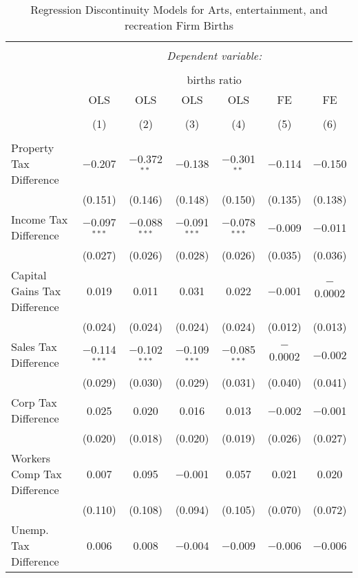 
\begin{table}[!htbp] \centering 
  \caption{Regression Discontinuity Models for  Arts, entertainment, and recreation Firm Births} 
  \label{71rd} 
\footnotesize 
\begin{tabular}{@{\extracolsep{5pt}}lcccccc} 
\\[-1.8ex]\hline 
\hline \\[-1.8ex] 
 & \multicolumn{6}{c}{\textit{Dependent variable:}} \\ 
\cline{2-7} 
\\[-1.8ex] & \multicolumn{6}{c}{births ratio} \\ 
 & OLS & OLS & OLS & OLS & FE & FE \\ 
\\[-1.8ex] & (1) & (2) & (3) & (4) & (5) & (6)\\ 
\hline \\[-1.8ex] 
 Property Tax Difference & $-$0.207 & $-$0.372$^{**}$ & $-$0.138 & $-$0.301$^{**}$ & $-$0.114 & $-$0.150 \\ 
  & (0.151) & (0.146) & (0.148) & (0.150) & (0.135) & (0.138) \\ 
  Income Tax Difference & $-$0.097$^{***}$ & $-$0.088$^{***}$ & $-$0.091$^{***}$ & $-$0.078$^{***}$ & $-$0.009 & $-$0.011 \\ 
  & (0.027) & (0.026) & (0.028) & (0.026) & (0.035) & (0.036) \\ 
  Capital Gains Tax Difference & 0.019 & 0.011 & 0.031 & 0.022 & $-$0.001 & $-$0.0002 \\ 
  & (0.024) & (0.024) & (0.024) & (0.024) & (0.012) & (0.013) \\ 
  Sales Tax Difference & $-$0.114$^{***}$ & $-$0.102$^{***}$ & $-$0.109$^{***}$ & $-$0.085$^{***}$ & $-$0.0002 & $-$0.002 \\ 
  & (0.029) & (0.030) & (0.029) & (0.031) & (0.040) & (0.041) \\ 
  Corp Tax Difference & 0.025 & 0.020 & 0.016 & 0.013 & $-$0.002 & $-$0.001 \\ 
  & (0.020) & (0.018) & (0.020) & (0.019) & (0.026) & (0.027) \\ 
  Workers Comp Tax Difference & 0.007 & 0.095 & $-$0.001 & 0.057 & 0.021 & 0.020 \\ 
  & (0.110) & (0.108) & (0.094) & (0.105) & (0.070) & (0.072) \\ 
  Unemp. Tax Difference & 0.006 & 0.008 & $-$0.004 & $-$0.009 & $-$0.006 & $-$0.006 \\ 

\end{tabular}
\end{table}
